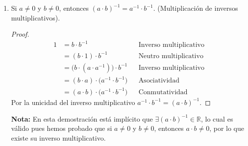 \documentclass[11pt]{article}
\newcommand{\R}{\mathbb{R}}
\begin{document}
\begin{enumerate}[label=\alph*)]
    \item Si $a\neq 0$ y $b\neq 0$, entonces $(a \cdot b)^{-1}=a^{-1} \cdot b^{-1}$. (Multiplicación de inversos multiplicativos).
    \vspace{-1em}
    \begin{proof} 
    \begin{align*}
        1 &= b\cdot b^{-1} && \text{Inverso multiplicativo}\\
        &= (b\cdot 1) \cdot b^{-1} && \text{Neutro multiplicativo}\\
        &= \bigl(b\cdot (a\cdot a^{-1})\bigr) \cdot b^{-1} && \text{Inverso multiplicativo}\\
        &= (b\cdot a) \cdot \bigl(a^{-1} \cdot b^{-1}\bigr) && \text{Asociatividad}\\
        &= (a\cdot b) \cdot \bigl(a^{-1} \cdot b^{-1}\bigr) && \text{Conmutatividad}
    \end{align*} Por la unicidad del inverso multiplicativo $a^{-1} \cdot b^{-1}=(a\cdot b)^{-1}$.
    \end{proof} \vspace{-1em}
    \textbf{Nota:} En esta demostración está implícito que $\exists (a\cdot b)^{-1}\in \R$, lo cual es válido pues hemos probado que si $a\neq 0$ y $b\neq 0$, entonces $a\cdot b\neq 0$, por lo que existe su inverso multiplicativo.


\end{enumerate}
\end{document}
